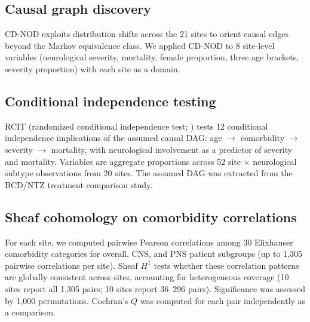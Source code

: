 \documentclass{article}
\begin{document}
\subsection{Causal graph discovery}

CD-NOD \cite{huang2020cdnod} exploits distribution shifts across the 21 sites to orient causal edges beyond the Markov equivalence class. We applied CD-NOD to 8 site-level variables (neurological severity, mortality, female proportion, three age brackets, severity proportion) with each site as a domain.

\subsection{Conditional independence testing}

RCIT (randomized conditional independence test; \citealt{strobl2019rcit}) tests 12 conditional independence implications of the assumed causal DAG: age $\to$ comorbidity $\to$ severity $\to$ mortality, with neurological involvement as a predictor of severity and mortality. Variables are aggregate proportions across 52 site $\times$ neurological subtype observations from 20 sites. The assumed DAG was extracted from the BCD/NTZ treatment comparison study.

\subsection{Sheaf cohomology on comorbidity correlations}

For each site, we computed pairwise Pearson correlations among 30 Elixhauser comorbidity categories for overall, CNS, and PNS patient subgroups (up to 1,305 pairwise correlations per site). Sheaf $H^1$ \cite{robinson2017sheaf} tests whether these correlation patterns are globally consistent across sites, accounting for heterogeneous coverage (10 sites report all 1,305 pairs; 10 sites report 36--296 pairs). Significance was assessed by 1,000 permutations. Cochran's $Q$ was computed for each pair independently as a comparison.




\end{document}
